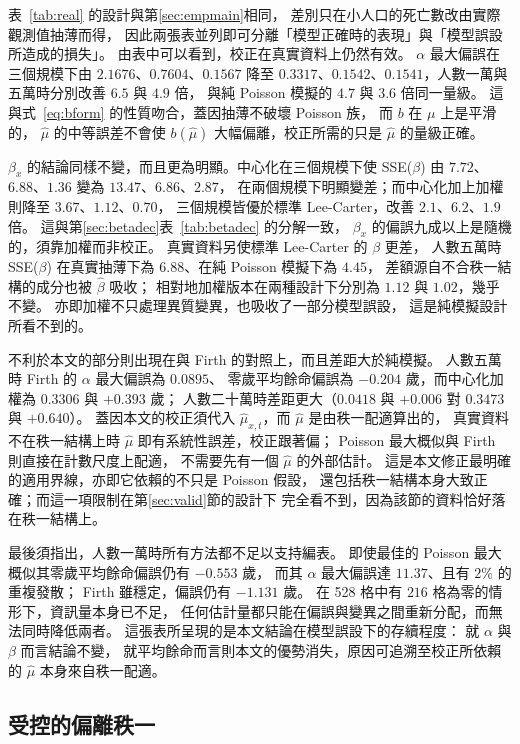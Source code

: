 \documentclass[UTF8, fontset=macnew, a4paper, 12pt]{ctexart}
\begin{document}
表~\ref{tab:real} 的設計與第\ref{sec:empmain}相同，
差別只在小人口的死亡數改由實際觀測值抽薄而得，
因此兩張表並列即可分離「模型正確時的表現」與「模型誤設所造成的損失」。
由表中可以看到，校正在真實資料上仍然有效。
$\alpha$ 最大偏誤在三個規模下由 $2.1676$、$0.7604$、$0.1567$
降至 $0.3317$、$0.1542$、$0.1541$，人數一萬與五萬時分別改善 $6.5$ 與 $4.9$ 倍，
與純 Poisson 模擬的 $4.7$ 與 $3.6$ 倍同一量級。
這與式~\eqref{eq:bform} 的性質吻合，蓋因抽薄不破壞 Poisson 族，
而 $b$ 在 $\mu$ 上是平滑的， $\hat\mu$ 的中等誤差不會使 $b(\hat\mu)$
大幅偏離，校正所需的只是 $\hat\mu$ 的量級正確。

$\beta_x$ 的結論同樣不變，而且更為明顯。中心化在三個規模下使
SSE($\beta$) 由 $7.72$、$6.88$、$1.36$ 變為 $13.47$、$6.86$、$2.87$，
在兩個規模下明顯變差；而中心化加上加權則降至 $3.67$、$1.12$、$0.70$，
三個規模皆優於標準 Lee-Carter，改善 $2.1$、$6.2$、$1.9$ 倍。
這與第\ref{sec:betadec}表~\ref{tab:betadec} 的分解一致，
$\beta_x$ 的偏誤九成以上是隨機的，須靠加權而非校正。
真實資料另使標準 Lee-Carter 的 $\beta$ 更差，
人數五萬時 SSE($\beta$) 在真實抽薄下為 $6.88$、在純 Poisson 模擬下為 $4.45$，
差額源自不合秩一結構的成分也被 $\hat\beta$ 吸收；
相對地加權版本在兩種設計下分別為 $1.12$ 與 $1.02$，幾乎不變。
亦即加權不只處理異質變異，也吸收了一部分模型誤設，
這是純模擬設計所看不到的。

不利於本文的部分則出現在與 Firth 的對照上，而且差距大於純模擬。
人數五萬時 Firth 的 $\alpha$ 最大偏誤為 $0.0895$、
零歲平均餘命偏誤為 $-0.204$ 歲，而中心化加權為 $0.3306$ 與 $+0.393$ 歲；
人數二十萬時差距更大（$0.0418$ 與 $+0.006$ 對 $0.3473$ 與 $+0.640$）。
蓋因本文的校正須代入 $\hat\mu_{x,t}$，而 $\hat\mu$ 是由秩一配適算出的，
真實資料不在秩一結構上時 $\hat\mu$ 即有系統性誤差，校正跟著偏；
Poisson 最大概似與 Firth 則直接在計數尺度上配適，
不需要先有一個 $\hat\mu$ 的外部估計。
這是本文修正最明確的適用界線，亦即它依賴的不只是 Poisson 假設，
還包括秩一結構本身大致正確；而這一項限制在第\ref{sec:valid}節的設計下
完全看不到，因為該節的資料恰好落在秩一結構上。

最後須指出，人數一萬時所有方法都不足以支持編表。
即使最佳的 Poisson 最大概似其零歲平均餘命偏誤仍有 $-0.553$ 歲，
而其 $\alpha$ 最大偏誤達 $11.37$、且有 $2\%$ 的重複發散；
Firth 雖穩定，偏誤仍有 $-1.131$ 歲。
在 528 格中有 $216$ 格為零的情形下，資訊量本身已不足，
任何估計量都只能在偏誤與變異之間重新分配，而無法同時降低兩者。
這張表所呈現的是本文結論在模型誤設下的存續程度：
就 $\alpha$ 與 $\beta$ 而言結論不變，
就平均餘命而言則本文的優勢消失，原因可追溯至校正所依賴的 $\hat\mu$
本身來自秩一配適。

\subsection{受控的偏離秩一}\label{sec:rank2}
\end{document}
